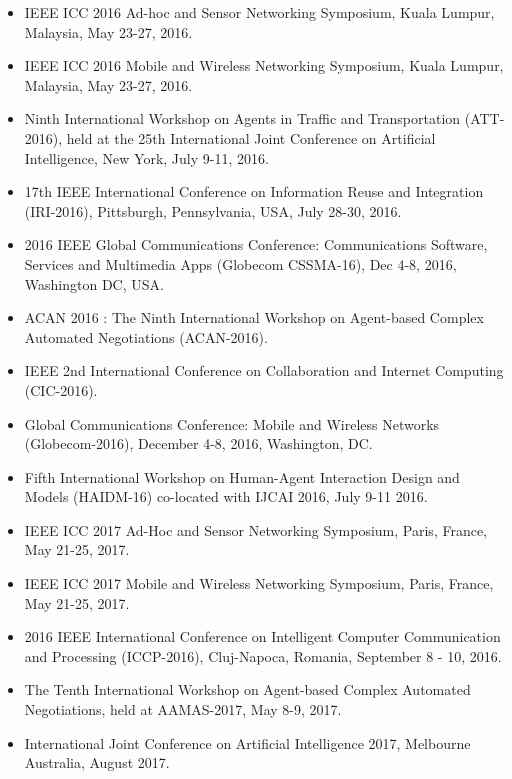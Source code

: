 \begin{itemize}
\item IEEE ICC 2016 Ad-hoc and Sensor Networking Symposium, Kuala Lumpur, Malaysia, May 23-27, 2016.

\item IEEE ICC 2016 Mobile and Wireless Networking Symposium, Kuala Lumpur, Malaysia, May 23-27, 2016.

\item  Ninth International Workshop on Agents in Traffic and Transportation (ATT-2016), held at the 25th International Joint Conference on Artificial Intelligence, New York, July 9-11, 2016.

\item 17th IEEE International Conference on Information Reuse and Integration (IRI-2016), Pittsburgh, Pennsylvania, USA, July 28-30, 2016.

\item 2016 IEEE Global Communications Conference: Communications Software, Services and Multimedia Apps (Globecom CSSMA-16), Dec 4-8, 2016, Washington DC, USA.

\item ACAN 2016 : The Ninth International Workshop on Agent-based Complex Automated Negotiations (ACAN-2016).

\item IEEE 2nd International Conference on Collaboration and Internet Computing (CIC-2016).

\item Global Communications Conference: Mobile and Wireless Networks (Globecom-2016), December 4-8, 2016, Washington, DC.

\item Fifth International Workshop on Human-Agent Interaction Design and Models (HAIDM-16) co-located with IJCAI 2016, July 9-11 2016.

\item IEEE ICC 2017 Ad-Hoc and Sensor Networking Symposium, Paris, France, May 21-25, 2017.

\item IEEE ICC 2017 Mobile and Wireless Networking Symposium, Paris, France, May 21-25, 2017.

\item 2016 IEEE International Conference on Intelligent
Computer Communication and Processing (ICCP-2016), Cluj-Napoca, Romania, September 8 - 10, 2016.

\item The Tenth International Workshop on Agent-based Complex Automated Negotiations, held at AAMAS-2017, May 8-9, 2017.
\item  International Joint Conference on Artificial Intelligence 2017, Melbourne Australia, August 2017.


\end{itemize}
